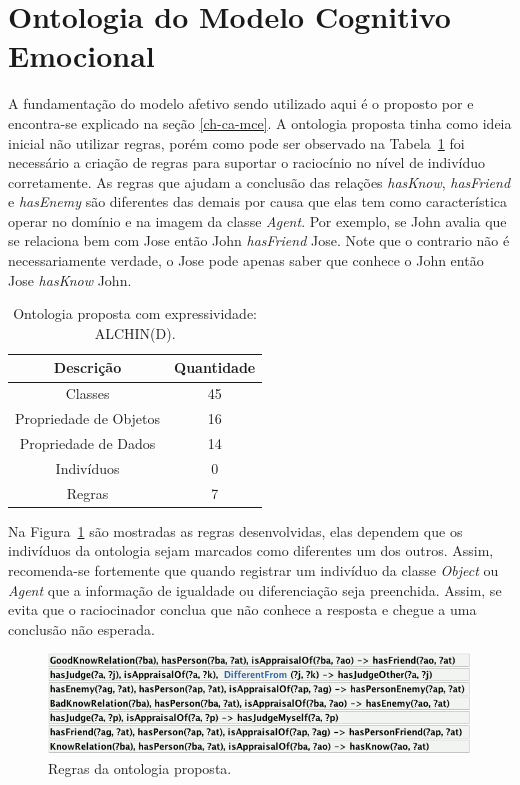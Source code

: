 \section{Ontologia do Modelo Cognitivo Emocional} \label{ch:aec:omce}

A fundamentação do modelo afetivo sendo utilizado aqui é o proposto por
\citet{ortony1988cse} e encontra-se explicado na seção \ref{ch-ca-mce}. A
ontologia proposta tinha como ideia inicial não utilizar regras, porém como
pode ser observado na Tabela~\ref{tab:oa:geral} foi necessário a criação de
regras para suportar o raciocínio no nível de indivíduo corretamente. As
regras que ajudam a conclusão das relações \emph{hasKnow}, \emph{hasFriend} e
\emph{hasEnemy} são diferentes das demais por causa que elas tem como
característica operar no domínio e na imagem da classe \emph{Agent}. Por
exemplo, se John avalia que se relaciona bem com Jose então John
\emph{hasFriend} Jose. Note que o contrario não é necessariamente verdade, o
Jose pode apenas saber que conhece o John então Jose \emph{hasKnow} John.

\begin{table}[h]
	\caption{Ontologia proposta com expressividade: ALCHIN(D).}
	\label{tab:oa:geral}
	\begin{center}
	\begin{tabular}{|c|c|}
		\hline
		Descrição & Quantidade \\ \hline
		Classes &  45 		\\ \hline
		Propriedade de Objetos & 16 \\ \hline
		Propriedade de Dados & 14 \\ \hline
		Indivíduos &  0		\\ \hline
		Regras & 7 \\ \hline
	\end{tabular}
	\end{center}
\end{table}

Na Figura~\ref{fig:rlocc} são mostradas as regras desenvolvidas, elas dependem
que os indivíduos da ontologia sejam marcados como diferentes um dos outros.
Assim, recomenda-se fortemente que quando registrar um indivíduo da classe
\emph{Object} ou \emph{Agent} que a informação de igualdade ou diferenciação
seja preenchida\dev{}. Assim, se evita que o raciocinador conclua que não
conhece a resposta e chegue a uma conclusão não esperada.

\begin{figure}[b]
  \centering
  \includegraphics[width=14cm]{figuras/rules-LOCC.png}
  \caption{Regras da ontologia proposta.}
  \label{fig:rlocc}
\end{figure}

